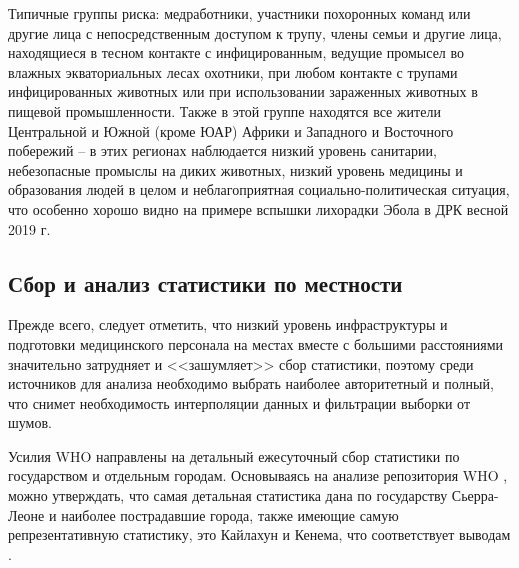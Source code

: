 Типичные группы риска: медработники, участники похоронных команд или другие лица с непосредственным доступом к трупу, члены семьи и другие лица, находящиеся в тесном контакте с инфицированным, ведущие промысел во влажных экваториальных лесах охотники, при любом контакте с трупами инфицированных животных или при использовании зараженных животных в пищевой промышленности. Также в этой группе находятся все жители Центральной и  Южной (кроме ЮАР) Африки  и Западного и Восточного  побережий -- в этих регионах наблюдается низкий уровень санитарии, небезопасные промыслы на диких животных, низкий уровень медицины и образования людей в целом и неблагоприятная социально-политическая ситуация, что особенно хорошо видно на примере вспышки лихорадки Эбола в ДРК весной 2019 г.


\subsection{Сбор  и анализ статистики по местности}

Прежде всего, следует отметить, что низкий уровень инфраструктуры и подготовки медицинского персонала на местах вместе с большими расстояниями значительно затрудняет и <<зашумляет>> сбор статистики, поэтому среди источников для анализа необходимо выбрать наиболее авторитетный и полный, что снимет необходимость интерполяции данных и фильтрации выборки от шумов.


Усилия WHO направлены на детальный ежесуточный сбор статистики по государством и отдельным городам. Основываясь на анализе репозитория WHO %
, можно утверждать, что самая детальная статистика дана по государству Сьерра-Леоне и наиболее пострадавшие города, также имеющие самую репрезентативную статистику, это Кайлахун и Кенема, что соответствует выводам %
.

